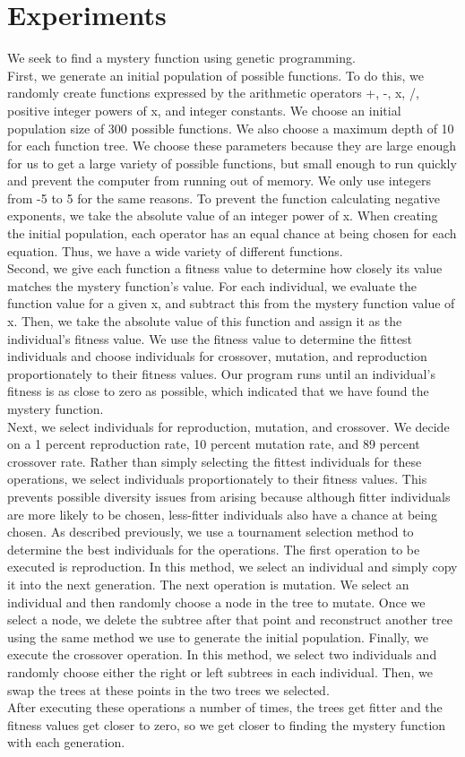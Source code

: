 
\section{Experiments}
\label{sec:expts}


We seek to find a mystery function using genetic programming. \\

First, we generate an initial population of possible functions. To do this, we randomly
create functions expressed by the arithmetic operators +, -, x, /, positive integer powers of x, and
integer constants. We choose an initial population size of 300 possible functions. We also choose a maximum depth of 10 for each function tree. We choose these parameters because they are large enough for us to get a large variety of possible functions, but small enough to run quickly and prevent the computer from running out of memory. We only use integers from -5 to 5 for the same reasons. To prevent the function calculating negative exponents, we take the absolute value of an integer power of x. When creating the initial population, each operator has an equal chance at being chosen for each equation. Thus, we have a wide variety of different functions. \\

Second, we give each function a fitness value to determine how closely its value matches the mystery function's value. For each individual, we evaluate the function value for a given x, and subtract this from the mystery function value of x. Then, we take the absolute value of this function and assign it as the individual's fitness value. We use the fitness value to determine the fittest individuals and choose individuals for crossover, mutation, and reproduction proportionately to their fitness values. Our program runs until an individual's fitness is as close to zero as possible, which indicated that we have found the mystery function.\\

Next, we select individuals for reproduction, mutation, and crossover. We decide on a 1 percent reproduction rate, 10 percent mutation rate, and 89 percent crossover rate. Rather than simply selecting the fittest individuals for these operations, we select individuals proportionately to their fitness values. This prevents possible diversity issues from arising because although fitter individuals are more likely to be chosen, less-fitter individuals also have a chance at being chosen. As described previously, we use a tournament selection method to determine the best individuals for the operations. The first operation to be executed is reproduction. In this method, we select an individual and simply copy it into the next generation. The next operation is mutation. We select an individual and then randomly choose a node in the tree to mutate. Once we select a node, we delete the subtree after that point and reconstruct another tree using the same method we use to generate the initial population. Finally, we execute the crossover operation. In this method, we select two individuals and randomly choose either the right or left subtrees in each individual. Then, we swap the trees at these points in the two trees we selected. \\

After executing these operations a number of times, the trees get fitter and the fitness values get closer to zero, so we get closer to finding the mystery function with each generation.




